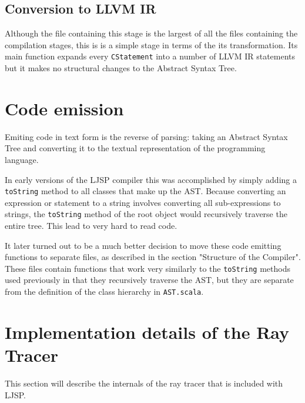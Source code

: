 \documentclass[11pt]{report}
\begin{document}


\subsection{Conversion to LLVM IR}

Although the file containing this stage is the largest of all the files containing the compilation stages, this is is a simple stage in terms of the its transformation. Its main function expands every \texttt{CStatement} into a number of LLVM IR statements but it makes no structural changes to the Abstract Syntax Tree.




\section{Code emission}
Emiting code in text form is the reverse of parsing: taking an Abstract Syntax Tree and converting it to the textual representation of the programming language.

In early versions of the LJSP compiler this was accomplished by simply adding a \texttt{toString} method to all classes that make up the AST. Because converting an expression or statement to a string involves converting all sub-expressions to strings, the \texttt{toString} method of the root object would recursively traverse the entire tree. This lead to very hard to read code. 

It later turned out to be a much better decision to move these code emitting functions to separate files, as described in the section "Structure of the Compiler". These files contain functions that work very similarly to the \texttt{toString} methods used previously in that they recursively traverse the AST, but they are separate from the definition of the class hierarchy in \texttt{AST.scala}.

\section{Implementation details of the Ray Tracer}
This section will describe the internals of the ray tracer that is included with LJSP.
\end{document}
